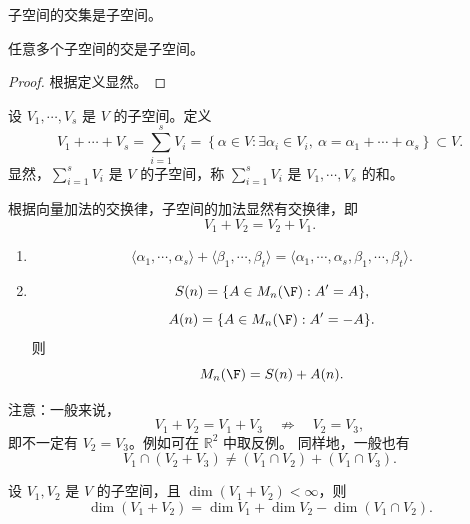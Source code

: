 子空间的交集是子空间。

\begin{proposition}
	任意多个子空间的交是子空间。
\end{proposition}

\begin{proof}
	根据定义显然。
\end{proof}

\begin{definition}\label{p1:concept:c4-l881}
	设 $V_1,\cdots,V_s$ 是 $V$ 的子空间。定义
	\[
	V_1+\cdots+V_s
	=\sum_{i=1}^{s}V_i
	=\left\{\alpha\in V:\exists \alpha_i\in V_i,\
	\alpha=\alpha_1+\cdots+\alpha_s\right\}\subset V.
	\]
	显然，$\sum\limits_{i=1}^{s}V_i$ 是 $V$ 的子空间，称 $\sum\limits_{i=1}^{s}V_i$ 是 $V_1,\cdots,V_s$ 的和。
\end{definition}

根据向量加法的交换律，子空间的加法显然有交换律，即
\[
V_1+V_2=V_2+V_1.
\]

\begin{example}
	\begin{enumerate}
		\item
		\[
		\langle \alpha_1,\cdots,\alpha_s\rangle
		+
		\langle \beta_1,\cdots,\beta_t\rangle
		=
		\langle \alpha_1,\cdots,\alpha_s,\beta_1,\cdots,\beta_t\rangle.
		\]
		
		\item 
		\[
		S(n)=\{A\in M_n(\F):A'=A\},
		\]
		\[
		A(n)=\{A\in M_n(\F):A'=-A\}.
		\]
		则
		\[
		M_n(\F)=S(n)+A(n).
		\]
	\end{enumerate}
\end{example}

注意：一般来说，
\[
V_1+V_2=V_1+V_3
\quad\not\Rightarrow\quad
V_2=V_3,
\]
即不一定有 $V_2=V_3$。例如可在 $\mathbb{R}^2$ 中取反例。
同样地，一般也有
\begin{equation}
V_1\cap (V_2+V_3)
\neq
(V_1\cap V_2)+(V_1\cap V_3).
\tag{$*$}
\end{equation}
\begin{proposition}
	设 $V_1,V_2$ 是 $V$ 的子空间，且 $\dim(V_1+V_2)<\infty$，则
	\[
	\dim(V_1+V_2)
	=
	\dim V_1+\dim V_2-\dim(V_1\cap V_2).
	\]
\end{proposition}

